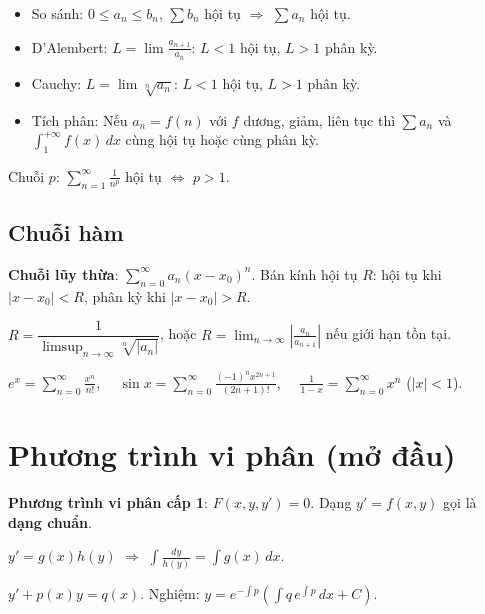 \documentclass[12pt,a4paper]{article}
\begin{document}
\begin{dinhly}[title={Chuỗi dương}]
  \begin{itemize}
    \item So sánh: $0 \le a_n \le b_n$, $\sum b_n$ hội tụ $\Rightarrow$ $\sum a_n$ hội tụ.
    \item D'Alembert: $\displaystyle L = \lim \frac{a_{n+1}}{a_n}$: $L < 1$ hội tụ, $L > 1$ phân kỳ.
    \item Cauchy: $\displaystyle L = \lim \sqrt[n]{a_n}$: $L < 1$ hội tụ, $L > 1$ phân kỳ.
    \item Tích phân: Nếu $a_n = f(n)$ với $f$ dương, giảm, liên tục thì $\sum a_n$ và $\int_1^{+\infty} f(x)\,dx$ cùng hội tụ hoặc cùng phân kỳ.
  \end{itemize}
\end{dinhly}

\begin{congthuc}
  Chuỗi $p$: $\displaystyle\sum_{n=1}^{\infty} \frac{1}{n^p}$ hội tụ $\Leftrightarrow$ $p > 1$.
\end{congthuc}

\subsection{Chuỗi hàm}

\begin{dinhnghia}
  \textbf{Chuỗi lũy thừa}: $\displaystyle\sum_{n=0}^{\infty} a_n (x - x_0)^n$. Bán kính hội tụ $R$: hội tụ khi $|x - x_0| < R$, phân kỳ khi $|x - x_0| > R$.
\end{dinhnghia}

\begin{congthuc}[title={Công thức Cauchy--Hadamard}]
  $R = \dfrac{1}{\displaystyle\limsup_{n \to \infty} \sqrt[n]{|a_n|}}$, hoặc $R = \displaystyle\lim_{n \to \infty} \left|\frac{a_n}{a_{n+1}}\right|$ nếu giới hạn tồn tại.
\end{congthuc}

\begin{vidu}
  $\displaystyle e^x = \sum_{n=0}^{\infty} \frac{x^n}{n!}$, $\quad \sin x = \sum_{n=0}^{\infty} \frac{(-1)^n x^{2n+1}}{(2n+1)!}$, $\quad \frac{1}{1-x} = \sum_{n=0}^{\infty} x^n$ ($|x| < 1$).
\end{vidu}

\section{Phương trình vi phân (mở đầu)}

\begin{dinhnghia}
  \textbf{Phương trình vi phân cấp 1}: $F(x, y, y') = 0$. Dạng $y' = f(x,y)$ gọi là \textbf{dạng chuẩn}.
\end{dinhnghia}

\begin{phuongphap}[title={Phương trình tách biến}]
  $y' = g(x)h(y)$ $\Rightarrow$ $\displaystyle\int \frac{dy}{h(y)} = \int g(x)\,dx$.
\end{phuongphap}

\begin{phuongphap}[title={Phương trình tuyến tính cấp 1}]
  $y' + p(x)y = q(x)$. Nghiệm: $y = e^{-\int p}\left(\int q\,e^{\int p}\,dx + C\right)$.
\end{phuongphap}
\end{document}

